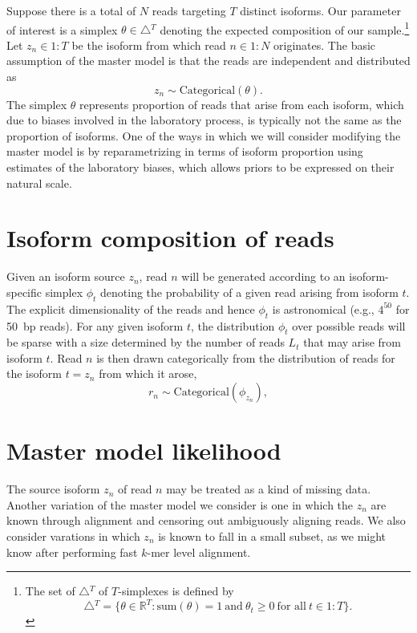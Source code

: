 \documentclass[11pt]{report}
\newcommand{\rngto}[1]{1{:}#1}
\begin{document}
Suppose there is a total of $N$ reads targeting $T$ distinct isoforms.
Our parameter of interest is a simplex $\theta \in \bigtriangleup\!^T$
denoting the expected composition of our sample.\footnote{The set of
  $\bigtriangleup\!^T$ of $T$-simplexes is defined by
  \[
    \bigtriangleup\!^T
    = \{ \theta \in \mathbb{R}^T : 
    \textrm{sum}(\theta) = 1
    \ \textrm{and} \
    \theta_t \geq 0 \ \textrm{for all} \ t \in \rngto{T}
    \}.
  \]
}
Let
$z_n \in \rngto{T}$ be the isoform from which read $n \in \rngto{N}$
originates. The basic assumption of the master model is that the reads
are independent and distributed as
\[
  z_n \sim \textrm{Categorical}(\theta).
\]
The simplex $\theta$ represents proportion of reads that arise from
each isoform, which due to biases involved in the laboratory process,
is typically not the same as the proportion of isoforms.  One of the
ways in which we will consider modifying the master model is by
reparametrizing in terms of isoform proportion using estimates of the
laboratory biases, which allows priors to be expressed on their
natural scale.

\section{Isoform composition of reads}

Given an isoform source $z_n$, read $n$ will be generated according to
an isoform-specific simplex $\phi_t$ denoting the probability of a
given read arising from isoform $t$.  The explicit dimensionality of
the reads and hence $\phi_t$ is astronomical (e.g., $4^{50}$ for 50~bp
reads).  For any given isoform $t$, the distribution $\phi_t$ over
possible reads will be sparse with a size determined by the number of
reads $L_t$ that may arise from isoform $t$.  Read $n$ is then drawn
categorically from the distribution of reads for the isoform $t = z_n$
from which it arose,
\[
  r_n \sim \textrm{Categorical}(\phi_{z_n}), 
\]

\section{Master model likelihood}

The source isoform $z_n$ of read $n$ may be treated as a kind of
missing data.  Another variation of the master model we consider is
one in which the $z_n$ are known through alignment and censoring out
ambiguously aligning reads.  We also consider varations in which $z_n$
is known to fall in a small subset, as we might know after performing
fast $k$-mer level alignment.
\end{document}
